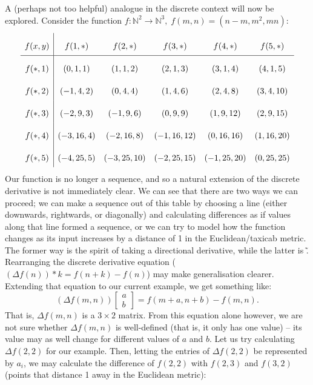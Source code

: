 \documentclass{article}
\theoremstyle{definition}
\begin{document}
A (perhaps not too helpful) analogue in the discrete context will now be explored. Consider the function $f:\mathbb{N}^2\rightarrow \mathbb{N}^3,\;f(m,n)=(n-m,m^2,mn)$:
\begin{align*}
	\def\arraystretch{2.2}
	\begin{array}{c|ccccc}
		f(x,y) & f(1,*) & f(2,*) & f(3,*) & f(4,*) & f(5,*) \\
		\hline
		f(*,1) & (0,1,1) & (1,1,2) & (2,1,3) & (3,1,4) & (4,1,5) \\
		f(*,2) & (-1,4,2) & (0,4,4) & (1,4,6) & (2,4,8) & (3,4,10) \\
		f(*,3) & (-2,9,3) & (-1,9,6) & (0,9,9) & (1,9,12) & (2,9,15) \\
		f(*,4) & (-3,16,4) & (-2,16,8) & (-1,16,12) & (0,16,16) & (1,16,20) \\
		f(*,5) & (-4,25,5) & (-3,25,10) & (-2,25,15) & (-1,25,20) & (0,25,25) \\
	\end{array}
\end{align*}
Our function is no longer a sequence, and so a natural extension of the discrete derivative is not immediately clear. We can see that there are two ways we can proceed; we can make a sequence out of this table by choosing a line (either downwards, rightwards, or diagonally) and calculating differences as if values along that line formed a sequence, or we can try to model how the function changes as its input increases by a distance of 1 in the Euclidean/taxicab metric. The former way is the spirit of taking a directional derivative, while the latter is \~. Rearranging the discrete derivative equation ($(\Delta f(n))*k=f(n+k)-f(n)$) may make generalisation clearer. Extending that equation to our current example, we get something like:
\[(\Delta f(m,n))\begin{bmatrix}a\\b\end{bmatrix}=f(m+a,n+b)-f(m,n).\]
That is, $\Delta f(m,n)$ is a $3\times2$ matrix. From this equation alone however, we are not sure whether $\Delta f(m,n)$ is well-defined (that is, it only has one value) -- its value may as well change for different values of $a$ and $b$.
Let us try calculating $\Delta f(2,2)$ for our example. Then, letting the entries of $\Delta f(2,2)$ be represented by $a_i$, we may calculate the difference of $f(2,2)$ with $f(2,3)$ and $f(3,2)$ (points that distance 1 away in the Euclidean metric):
\end{document}
